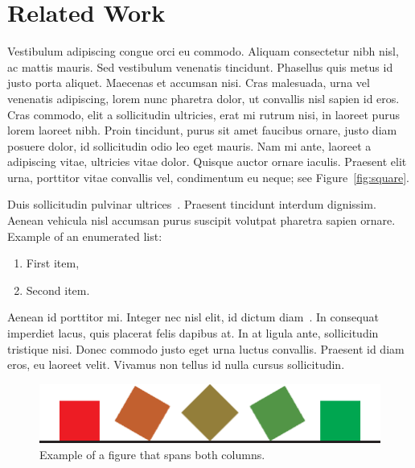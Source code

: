 \documentclass[submission]{gmp2015}
\begin{document}

\section{Related Work}\label{sec:relatedwork}

Vestibulum adipiscing congue orci eu commodo. Aliquam consectetur nibh nisl, ac mattis mauris. Sed vestibulum venenatis tincidunt. Phasellus quis metus id justo porta aliquet. Maecenas et accumsan nisi. Cras malesuada, urna vel venenatis adipiscing, lorem nunc pharetra dolor, ut convallis nisl sapien id eros. Cras commodo, elit a sollicitudin ultricies, erat mi rutrum nisi, in laoreet purus lorem laoreet nibh. Proin tincidunt, purus sit amet faucibus ornare, justo diam posuere dolor, id sollicitudin odio leo eget mauris. Nam mi ante, laoreet a adipiscing vitae, ultricies vitae dolor. Quisque auctor ornare iaculis. Praesent elit urna, porttitor vitae convallis vel, condimentum eu neque; see Figure~\ref{fig:square}.

Duis sollicitudin pulvinar ultrices~\cite{Peters:1997:BBC}. Praesent tincidunt interdum dignissim. Aenean vehicula nisl accumsan purus suscipit volutpat pharetra sapien ornare.
%
Example of an enumerated list:
\begin{enumerate}
  \item First item,
  \item Second item.
\end{enumerate}

Aenean id porttitor mi. Integer nec nisl elit, id dictum diam~\cite{Kazhdan:2008:SMF}. In consequat imperdiet lacus, quis placerat felis dapibus at. In at ligula ante, sollicitudin tristique nisi. Donec commodo justo eget urna luctus convallis. Praesent id diam eros, eu laoreet velit. Vivamus non tellus id nulla cursus sollicitudin.

\begin{figure}\centering
\includegraphics{example.eps}
\caption{Example of a figure that spans both columns.}
\end{figure}

\end{document}
